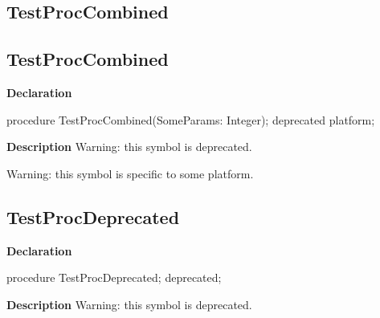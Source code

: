 \documentclass{report}
\newif\ifpdf
\begin{document}
\subsection*{\large{\textbf{TestProcCombined}}\normalsize\hspace{1ex}\hrulefill}
\else
\subsection*{TestProcCombined}
\fi
\label{ok_hint_directives-TestProcCombined}
\begin{list}{}{
\setlength{\itemindent}{0cm}
\setlength{\listparindent}{0cm}
\setlength{\leftmargin}{\evensidemargin}
\addtolength{\leftmargin}{\tmplength}
\settowidth{\labelsep}{X}
\addtolength{\leftmargin}{\labelsep}
\setlength{\labelwidth}{\tmplength}
}
\item[\textbf{Declaration}\hfill]
\ifpdf
\begin{flushleft}
\fi
\begin{ttfamily}
procedure TestProcCombined(SomeParams: Integer); deprecated  platform;\end{ttfamily}

\ifpdf
\end{flushleft}
\fi

\par
\item[\textbf{Description}]
Warning: this symbol is deprecated.

Warning: this symbol is specific to some platform.

 

\end{list}
\ifpdf
\subsection*{\large{\textbf{TestProcDeprecated}}\normalsize\hspace{1ex}\hrulefill}
\else
\subsection*{TestProcDeprecated}
\fi
\label{ok_hint_directives-TestProcDeprecated}
\begin{list}{}{
\setlength{\itemindent}{0cm}
\setlength{\listparindent}{0cm}
\setlength{\leftmargin}{\evensidemargin}
\addtolength{\leftmargin}{\tmplength}
\settowidth{\labelsep}{X}
\addtolength{\leftmargin}{\labelsep}
\setlength{\labelwidth}{\tmplength}
}
\item[\textbf{Declaration}\hfill]
\ifpdf
\begin{flushleft}
\fi
\begin{ttfamily}
procedure TestProcDeprecated; deprecated;\end{ttfamily}

\ifpdf
\end{flushleft}
\fi

\par
\item[\textbf{Description}]
Warning: this symbol is deprecated.

 

\end{list}
\ifpdf
\end{document}
